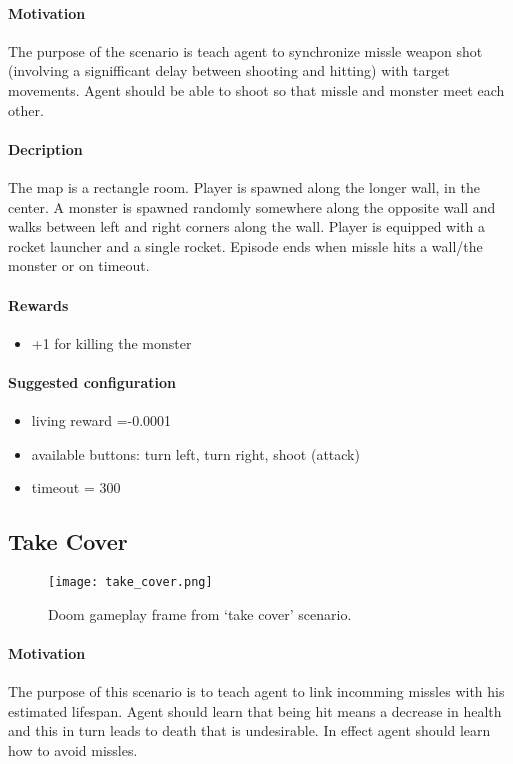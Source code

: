 		\paragraph{Motivation} 
			The purpose of the scenario is teach agent to synchronize missle weapon shot (involving a signifficant delay between shooting and hitting) with target movements. Agent should be able to shoot so that missle and monster meet each other.

		\paragraph{Decription}
			The map is a rectangle room. Player is spawned along the longer wall, in the center. A monster is spawned randomly somewhere along the opposite wall and walks between left and right corners along the wall. Player is equipped with a rocket launcher and a single rocket. Episode ends when missle hits a wall/the monster or on timeout.
		\paragraph{Rewards}
		\begin{itemize}
			\item +1 for killing the monster
		\end{itemize}
		
		\paragraph{Suggested configuration}
		\begin{itemize}
			\item living reward =-0.0001
			\item available buttons: turn left, turn right, shoot (attack)
			\item timeout = 300
		\end{itemize}
	\newpage

	\subsection{Take Cover}
		\begin{figure}
			\centering
			\texttt{[image: take\_cover.png]}
			\caption{Doom gameplay frame from `take cover' scenario.}
		\end{figure}
		\paragraph{Motivation} 
			The purpose of this scenario is to teach agent to link incomming missles with his estimated lifespan. Agent should learn that being hit means a decrease in health and this in turn leads to death that is undesirable. In effect agent should learn how to avoid missles.

